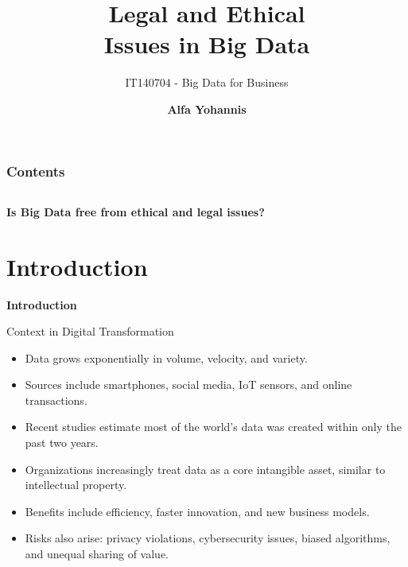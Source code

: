 \documentclass[aspectratio=169, table]{beamer}
\title{\Huge Legal and Ethical\\
\vspace{10pt}
Issues in Big Data}
\subtitle{IT140704 - Big Data for Business}
\author{\textbf{Alfa Yohannis}}
\begin{document}
\frame{\titlepage}


\begin{frame}[fragile]
	\frametitle{Contents}
	\vspace{20pt}
	\begin{columns}[t]
		\tableofcontents[sections={1-5}]
		
		\tableofcontents[sections={6-20}]
	\end{columns}
\end{frame}

\begin{frame}{\hfill}
	\centering
	\Huge{\textbf{Is Big Data free from ethical and legal issues?}}
\end{frame}


\section{Introduction}
\begin{frame}{\hfill}
	\centering
	\Huge{\textbf{Introduction}}
\end{frame}

\begin{frame}{Context in Digital Transformation}
	\vspace{20pt}
	\begin{itemize}
		\item Data grows exponentially in volume, velocity, and variety.  
		\item Sources include smartphones, social media, IoT sensors, and online transactions.  
		\item Recent studies estimate most of the world’s data was created within only the past two years.  
		\item Organizations increasingly treat data as a core intangible asset, similar to intellectual property.  
		\item Benefits include efficiency, faster innovation, and new business models.  
		\item Risks also arise: privacy violations, cybersecurity issues, biased algorithms, and unequal sharing of value.  
	\end{itemize}
\end{frame}
\end{document}
